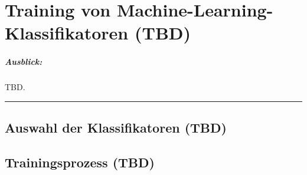 
\chapter{Training von Machine-Learning-Klassifikatoren (TBD)}

\paragraph{Ausblick:}
TBD.
\\
\hrule

\section{Auswahl der Klassifikatoren (TBD)}

\section{Trainingsprozess (TBD)}

\cleardoublepage